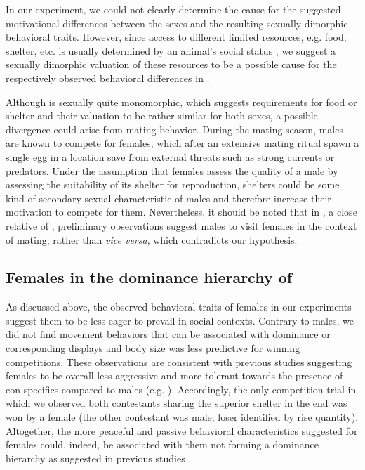In our experiment, we could not clearly determine the cause for the suggested motivational differences between the sexes and the resulting sexually dimorphic behavioral traits. However, since access to different limited resources, e.g. food, shelter, etc. is usually  determined by an animal's social status \citep{Janson1985, Blumstein2001, Charpentier2005, Dunham2008}, we suggest a sexually dimorphic valuation of these resources to be a possible cause for the respectively observed behavioral differences in \lepto{}. 

Although \lepto{} is sexually quite monomorphic, which suggests requirements for food or shelter and their valuation to be rather similar for both sexes, a possible divergence could arise from \lepto{} mating behavior. During the mating season, males are known to compete for females, which after an extensive mating ritual spawn a single egg in a location save from external threats such as strong currents or predators. Under the assumption that females assess the quality of a male by assessing the suitability of its shelter for reproduction, shelters could be some kind of secondary sexual characteristic of males and therefore increase their motivation to compete for them. Nevertheless, it should be noted that in \rostratus, a close relative of \lepto{}, preliminary observations suggest males to visit females in the context of mating, rather than \textit{vice versa}, which contradicts our hypothesis.  



\subsection{Females in the dominance hierarchy of \lepto{}}

As discussed above, the observed behavioral traits of females in our experiments suggest them to be less eager to prevail in social contexts. Contrary to males, we did not find movement behaviors that can be associated with dominance or corresponding displays and body size was less predictive for winning competitions. These observations are consistent with previous studies suggesting females to be overall less aggressive and more tolerant towards the presence of con-specifics compared to males (e.g. \citealp{Dunlap2002}). Accordingly, the only competition trial in which we observed both contestants sharing the superior shelter in the end was won by a female (the other contestant was male; loser identified by rise quantity). Altogether, the more peaceful and passive behavioral characteristics suggested for females could, indeed, be associated with them not forming a dominance hierarchy as suggested in previous studies \citep{Hagedorn1985, Dunlap2002}. 

